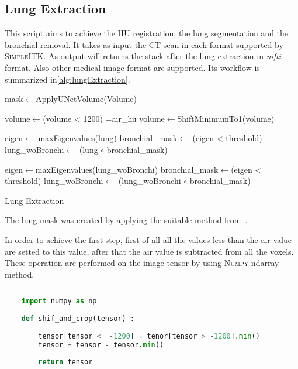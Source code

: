 \documentclass{standalone}
\begin{document}
	\subsection{Lung Extraction}
	
	This script aims to achieve the HU registration, the lung segmentation and the bronchial removal. It takes as input the CT scan in each format supported by \textsc{SimpleITK}. As output will returns the stack after the lung extraction in \textit{nifti} format. Also other medical image format are supported. Its workflow is summarized in\ref{alg:lungExtraction}.
	
		 
	\begin{algorithm}
		
		\SetAlgoLined
		\DontPrintSemicolon
	
		\;
		
		mask$\leftarrow$ApplyUNetVolume(Volume)\;
		
		volume$\leftarrow$(volume < 1200) =air\_hu\;
		volume$\leftarrow$ShiftMinimumTo1(volume)\;
		
		\;
		
		eigen$\leftarrow$ maxEigenvalues(lung)\;
		bronchial\_mask$\leftarrow$ (eigen < threshold)\;
		lung\_woBronchi$\leftarrow$ (lung $\circ$ bronchial\_mask)\;
		
		\;
		
		eigen$\leftarrow$maxEigenvalues(lung\_woBronchi)\;
		bronchial\_mask$\leftarrow$(eigen < threshold)\;
		lung\_woBronchi$\leftarrow$ (lung\_woBronchi $\circ$ bronchial\_mask)\;
	
		\caption{Lung Extraction}\label{alg:lungExtraction}
		
	\end{algorithm}
	
	
	The lung mask was created by applying the suitable method from~\cite{REP:lungmask}. 

	In order to achieve the first step, first of all all the values less than the air value are setted to this value, after that the air value is subtracted from all the voxels. These operation are performed on the image tensor by using \textsc{Numpy} ndarray method.  
	
	\lstset{style=python}
	\begin{lstlisting}[language=python, caption=HU registering function, label=code:saf]
		
	import numpy as np
		
	def shif_and_crop(tensor) :
		
		tensor[tensor <  -1200] = tenor[tensor > -1200].min()
		tensor = tensor - tensor.min()
	
		return tensor
	\end{lstlisting}
\end{document}
